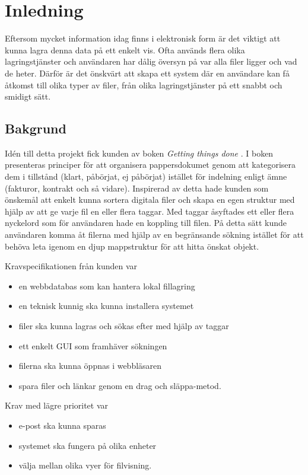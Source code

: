 \chapter{Inledning}
\label{ch:inledning}
Eftersom mycket information idag finns i elektronisk form är det viktigt att kunna lagra denna data på ett enkelt vis. Ofta används flera olika lagringstjänster och användaren har dålig översyn på var alla filer ligger och vad de heter. Därför är det önskvärt att skapa ett system där en användare kan få åtkomst till olika typer av filer, från olika lagringstjänster på ett snabbt och smidigt sätt.

\section{Bakgrund}
Idén till detta projekt fick kunden av boken \textit{Getting things done} \cite{gettingthingsdone}. I boken presenteras principer för att organisera pappersdokumet genom att kategorisera dem i tillstånd (klart, påbörjat, ej påbörjat) istället för indelning enligt ämne (fakturor, kontrakt och så vidare). Inspirerad av detta hade kunden som önskemål att enkelt kunna sortera digitala filer och skapa en egen struktur med hjälp av att ge varje fil en eller flera taggar. Med taggar åsyftades ett eller flera nyckelord som för användaren hade en koppling till filen. På detta sätt kunde användaren komma åt filerna med hjälp av en begränsande sökning istället för att behöva leta igenom en djup mappstruktur för att hitta önskat objekt.

Kravspecifikationen från kunden var 
\begin{itemize}
\item en webbdatabas som kan hantera lokal fillagring
\item en teknisk kunnig ska kunna installera systemet
\item filer ska kunna lagras och sökas efter med hjälp av taggar
\item ett enkelt GUI som framhäver sökningen
\item filerna ska kunna öppnas i webbläsaren
\item spara filer och länkar genom en drag och släppa-metod.
\end{itemize}

Krav med lägre prioritet var
\begin{itemize}
\item e-post ska kunna sparas
\item systemet ska fungera på olika enheter
\item välja mellan olika vyer för filvisning.
\end{itemize}

